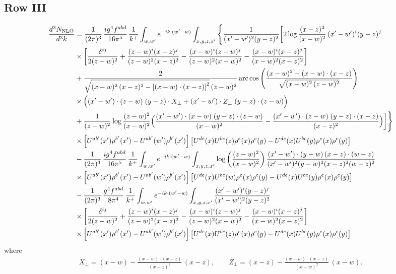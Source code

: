 \documentclass[9pt]{article}
\numberwithin{equation}{section}
\begin{document}
\subsection{Row III}
\begin{align}
\frac{d^{3}N_{\rm NLO}}{d^{3}k} &=\frac{1}{(2\pi)^{3}}\,\frac{ig^{4}f^{abd}}{16\pi^{5}}\,\frac{1}{k^{+}}\int_{w,w'}e^{-ik\cdot(w'-w)}\int_{x,y,z,x'}\Bigg\{\frac{1}{(x'-w')^{2}(y-z)^{2}}\bigg[2\log\frac{(x-z)^{2}}{(x-w)^{2}}\,(x'-w')^{i}(y-z)^{j}\notag \\
& \times\bigg[\frac{\delta^{ij}}{2(z-w)^{2}}+\frac{(z-w)^{i}(x-z)^{j}}{(z-w)^{2}(x-z)^{2}}-\frac{(x-w)^{i}(z-w)^{j}}{(z-w)^{2}(x-w)^{2}}-\frac{(x-w)^{i}(x-z)^{j}}{(x-w)^{2}(x-z)^{2}}\bigg]\notag \\
& +\frac{2}{\sqrt{(x-w)^{2}\,(x-z)^{2}-\left[(x-w)\cdot (x-z)\right]^{2}}\,(z-w)^{2}}\,\mathrm{arc\,cos}\left(\frac{(x-w)^{2}-(x-w)\cdot (x-z)}{\sqrt{(x-w)^{2}\,(z-w)^{2}}}\right)\notag \\
& \times\Big((x'-w')\cdot(z-w)\;(y-z)\cdot X_{\perp}+(x'-w')\cdot Z_{\perp}\;(y-z)\cdot(z-w)\Big)\notag\\
&+\frac{1}{(z-w)^{2}}\log\frac{(z-w)^{2}}{(x-w)^{2}}\Big(\frac{(x'-w')\cdot(x-w)\;(y-z)\cdot(z-w)}{(x-w)^{2}}-\frac{(x'-w')\cdot(z-w)\;(y-z)\cdot(x-z)}{(x-z)^{2}}\Big)\bigg]\Bigg\}\notag\\
&\times\left[U^{ab'}(x')\rho^{b'}(x')-U^{ab'}(w')\rho^{b'}(x')\right]\left[U^{de}(x)U^{bc}(z)\rho^{e}(x)\rho^{c}(y)-U^{de}(x)U^{bc}(y)\rho^{e}(x)\rho^{c}(y)\right]\notag\\
&-\frac{1}{(2\pi)^{3}}\,\frac{ig^{4}f^{abd}}{16\pi^{5}}\,\frac{1}{k^{+}}\int_{w,w'}e^{-ik\cdot(w'-w)}\int_{x,y,z,x'}\log\left(\frac{(z-w)^{2}}{(x-w)^{2}}\right)\frac{(x'-w')\cdot(y-w)\,(x-z)\cdot(w-z)}{(x'-w')^{2}(y-w)^{2}(x-z)^{2}(w-z)^{2}}\notag\\
&\times\left[U^{ab'}(x')\rho^{b'}(x')-U^{ab'}(w')\rho^{b'}(x')\right]\left[U^{de}(x)U^{bc}(w)\rho^{e}(x)\rho^{c}(y)-U^{de}(x)U^{bc}(y)\rho^{e}(x)\rho^{c}(y)\right]\notag \\
&-\frac{1}{(2\pi)^{3}}\,\frac{g^{4}f^{abd}}{8\pi^{4}}\,\frac{1}{k^{+}}\int_{w,w'}e^{-ik\cdot(w'-w)}\int_{x,y,z,x'}\frac{(x'-w')^{i}(y-z)^{j}}{(x'-w')^{2}(y-z)^{2}}\notag \\
&\times\bigg[\frac{\delta^{ij}}{2(z-w)^{2}}+\frac{(z-w)^{i}(x-z)^{j}}{(z-w)^{2}(x-z)^{2}}-\frac{(x-w)^{i}(z-w)^{j}}{(z-w)^{2}(x-w)^{2}}-\frac{(x-w)^{i}(x-z)^{j}}{(x-w)^{2}(x-z)^{2}}\bigg] \notag\\
&\times\left[U^{ab'}(x')\rho^{b'}(x')-U^{ab'}(w')\rho^{b'}(x')\right]\left[U^{de}(x)U^{bc}(z)\rho^{e}(x)\rho^{c}(y)-U^{de}(x)U^{bc}(y)\rho^{e}(x)\rho^{c}(y)\right]
\end{align}
where
\begin{align}
X_{\perp}=(x-w)-\frac{(x-w)\cdot(x-z)}{(x-z)^{2}}\,(x-z),\qquad
Z_{\perp}=(x-z)-\frac{(x-w)\cdot(x-z)}{(x-w)^{2}}\,(x-w).
\end{align}
\end{document}
